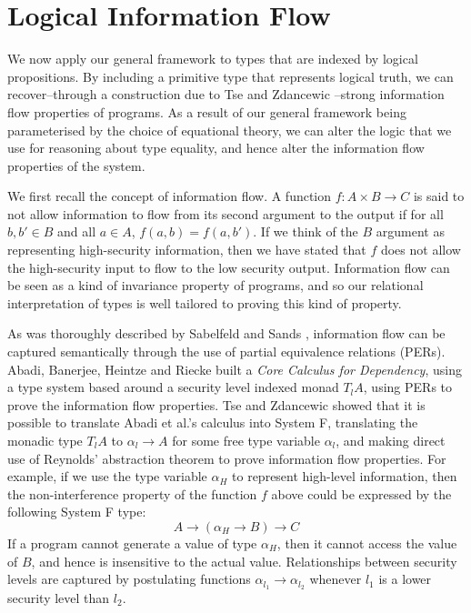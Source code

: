 \section{Logical Information Flow}
\label{sec:information-flow}

\newcommand{\infoflow}{\mathit{Log}}

We now apply our general framework to types that are indexed by
logical propositions. By including a primitive type that represents
logical truth, we can recover--through a construction due to Tse and
Zdancewic \cite{tse04translating}--strong information flow properties
of programs. As a result of our general framework being parameterised
by the choice of equational theory, we can alter the logic that we use
for reasoning about type equality, and hence alter the information
flow properties of the system. 

We first recall the concept of information flow. A function $f : A
\times B \to C$ is said to not allow information to flow from its
second argument to the output if for all $b,b' \in B$ and all $a \in
A$, $f(a,b) = f(a,b')$. If we think of the $B$ argument as
representing high-security information, then we have stated that $f$
does not allow the high-security input to flow to the low security
output. Information flow can be seen as a kind of invariance property
of programs, and so our relational interpretation of types is well
tailored to proving this kind of property.

As was thoroughly described by Sabelfeld and Sands
\cite{sabelfeld01per}, information flow can be captured semantically
through the use of partial equivalence relations (PERs). Abadi,
Banerjee, Heintze and Riecke \cite{abadi99core} built a \emph{Core
  Calculus for Dependency}, using a type system based around a
security level indexed monad $T_lA$, using PERs to prove the
information flow properties. Tse and Zdancewic \cite{tse04translating}
showed that it is possible to translate Abadi et al.'s calculus into
System F, translating the monadic type $T_lA$ to $\alpha_l \to A$ for
some free type variable $\alpha_l$, and making direct use of Reynolds'
abstraction theorem to prove information flow properties. For example,
if we use the type variable $\alpha_H$ to represent high-level
information, then the non-interference property of the function $f$
above could be expressed by the following System F type:
\begin{displaymath}
  A \to (\alpha_H \to B) \to C
\end{displaymath}
If a program cannot generate a value of type $\alpha_H$, then it
cannot access the value of $B$, and hence is insensitive to the actual
value. Relationships between security levels are captured by
postulating functions $\alpha_{l_1} \to \alpha_{l_2}$ whenever $l_1$
is a lower security level than $l_2$.

